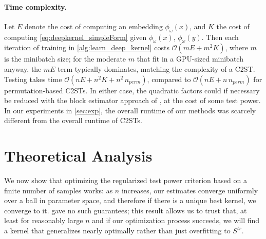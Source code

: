 \documentclass{article}
\begin{document}
\paragraph{Time complexity.}
Let $E$ denote the cost of computing an embedding $\phi_\omega(x)$,
and $K$ the cost of computing \eqref{eq:deepkernel_simpleForm} given $\phi_\omega(x)$, $\phi_\omega(y)$.
Then each iteration of training in \cref{alg:learn_deep_kernel}
costs $\mathcal{O}\left( m E + m^2 K \right)$, where $m$ is the minibatch size;
for the moderate $m$ that fit in a GPU-sized minibatch anyway,
the $m E$ term typically dominates,
matching the complexity of a C2ST.
Testing takes time $\mathcal{O}\left( n E + n^2 K + n^2 \, n_\mathit{perm} \right)$,
compared to $\mathcal{O}\left( n E + n \, n_\mathit{perm} \right)$ for permutation-based C2STs.
In either case, the quadratic factors could if necessary be reduced with the block estimator approach of \citet{Blaschko2013}, at the cost of some test power.
In our experiments in \cref{sec:exp}, the overall runtime of our methods was scarcely different from the overall runtime of C2STs.


\section{Theoretical Analysis}
We now show that optimizing the regularized test power criterion based on a finite number of samples works:
as $n$ increases, our estimates converge uniformly over a ball in parameter space,
and therefore if there is a unique best kernel,
we converge to it.
\citet{sutherland:mmd-opt} gave no such guarantees;
this result allows us to trust that,
at least for reasonably large $n$ and if our optimization process succeeds,
we will find a kernel that generalizes nearly optimally
rather than just overfitting to $S^{tr}$.
\end{document}
